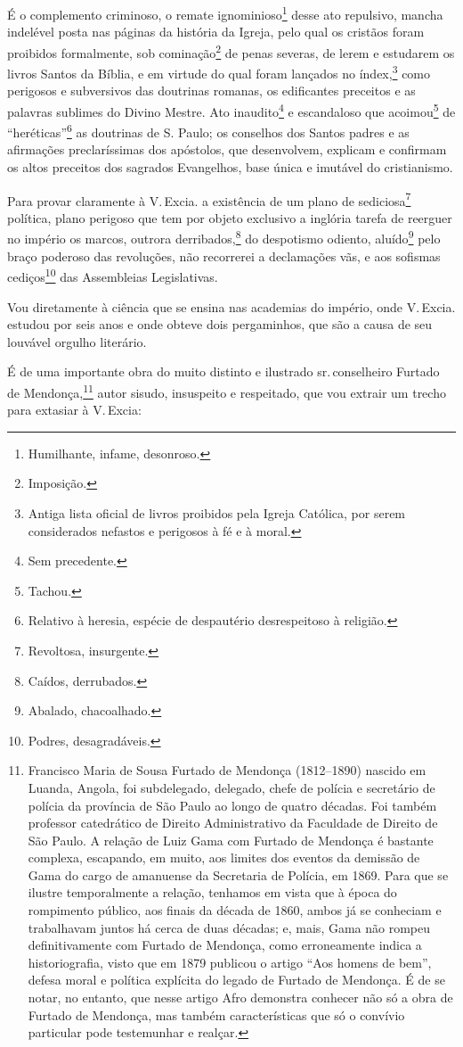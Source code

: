 É o complemento criminoso, o remate ignominioso\footnote{Humilhante,
  infame, desonroso.} desse ato repulsivo, mancha indelével posta nas
páginas da história da Igreja, pelo qual os cristãos foram proibidos
formalmente, sob cominação\footnote{Imposição.} de penas severas, de
lerem e estudarem os livros Santos da Bíblia, e em virtude do qual foram
lançados no índex,\footnote{Antiga lista oficial de livros proibidos
  pela Igreja Católica, por serem considerados nefastos e perigosos à fé
  e à moral.} como perigosos e subversivos das doutrinas romanas, os
edificantes preceitos e as palavras sublimes do Divino Mestre. Ato
inaudito\footnote{Sem precedente.} e escandaloso que
acoimou\footnote{Tachou.} de ``heréticas''\footnote{Relativo à heresia,
  espécie de despautério desrespeitoso à religião.} as doutrinas de S.
Paulo; os conselhos dos Santos padres e as afirmações preclaríssimas dos
apóstolos, que desenvolvem, explicam e confirmam os altos preceitos dos
sagrados Evangelhos, base única e imutável do cristianismo.

Para provar claramente à V.\,Excia. a existência de um plano de
sediciosa\footnote{Revoltosa, insurgente.} política, plano perigoso
que tem por objeto exclusivo a inglória tarefa de reerguer no império os
marcos, outrora derribados,\footnote{Caídos, derrubados.} do
despotismo odiento, aluído\footnote{Abalado, chacoalhado.} pelo braço
poderoso das revoluções, não recorrerei a declamações vãs, e aos
sofismas cediços\footnote{Podres, desagradáveis.} das Assembleias
Legislativas.

Vou diretamente à ciência que se ensina nas academias do império, onde
V.\,Excia. estudou por seis anos e onde obteve dois pergaminhos, que são
a causa de seu louvável orgulho literário.

É de uma importante obra do muito distinto e ilustrado sr.\,conselheiro
Furtado de Mendonça,\footnote{Francisco Maria de Sousa Furtado de\label{furtado}
  Mendonça (1812--1890) nascido em Luanda, Angola, foi subdelegado,
  delegado, chefe de polícia e secretário de polícia da província de São
  Paulo ao longo de quatro décadas. Foi também professor catedrático
  de Direito Administrativo da Faculdade de Direito de São Paulo. A
  relação de Luiz Gama com Furtado de Mendonça é bastante complexa,
  escapando, em muito, aos limites dos eventos da demissão de Gama do
  cargo de amanuense da Secretaria de Polícia, em 1869. Para que se
  ilustre temporalmente a relação, tenhamos em vista que à época do
  rompimento público, aos finais da década de 1860, ambos já se
  conheciam e trabalhavam juntos há cerca de duas décadas; e, mais, Gama
  não rompeu definitivamente com Furtado de Mendonça, como erroneamente
  indica a historiografia, visto que em 1879 publicou o artigo ``Aos
  homens de bem'', defesa moral e política explícita do legado de Furtado
  de Mendonça. É de se notar, no entanto, que nesse artigo Afro
  demonstra conhecer não só a obra de Furtado de Mendonça, mas também
  características que só o convívio particular pode testemunhar e
  realçar.} autor sisudo, insuspeito e respeitado, que vou extrair um
trecho para extasiar à V.\,Excia:

